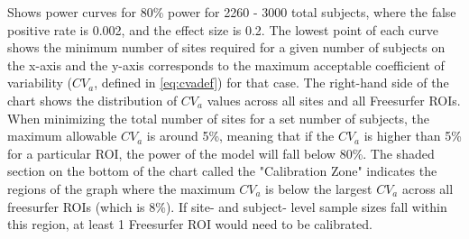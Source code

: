 \label{fig:cv_j} Shows power curves for 80\% power for 2260 - 3000 total subjects, where the false positive rate is 0.002, and the effect size is 0.2. The lowest point of each curve shows the minimum number of sites required for a given number of subjects on the x-axis and the y-axis corresponds to the maximum acceptable coefficient of variability ($CV_{a}$, defined in \ref{eq:cvadef}) for that case. The right-hand side of the chart shows the distribution of $CV_{a}$ values across all sites and all Freesurfer ROIs. When minimizing the total number of sites for a set number of subjects, the maximum allowable $CV_{a}$ is around 5\%, meaning that if the $CV_{a}$ is higher than 5\% for a particular ROI, the power of the model will fall below 80\%. The shaded section on the bottom of the chart called the "Calibration Zone" indicates the regions of the graph where the maximum $CV_{a}$ is below the largest $CV_{a}$ across all freesurfer ROIs (which is 8\%). If site- and subject- level sample sizes fall within this region, at least 1 Freesurfer ROI would need to be calibrated.